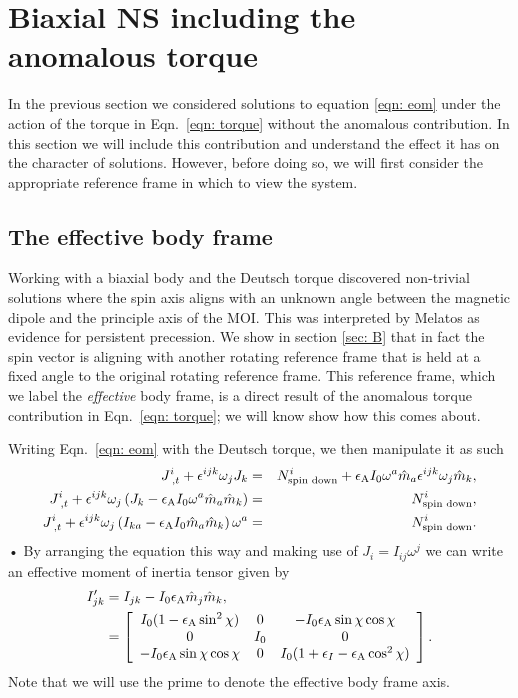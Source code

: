 \documentclass[../full_thesis/full_thesis.tex]{subfiles}
\begin{document}
\FloatBarrier

\section{Biaxial NS including the anomalous torque}
In the previous section we considered solutions to equation \eqref{eqn: eom}
under the action of the torque in Eqn.~\eqref{eqn: torque} without the
anomalous contribution. In this section we will include this contribution and
understand the effect it has on the character of solutions. However, before
doing so, we will first consider the appropriate reference frame in which to
view the system.

\subsection{The effective body frame}
\label{sec: effective body frame}
Working with a biaxial body and the Deutsch torque \cite{Melatos2000}
discovered non-trivial solutions where the spin axis aligns with an unknown
angle between the magnetic dipole and the principle axis of the MOI.  This was
interpreted by Melatos as evidence for persistent precession. We show in
section \ref{sec: B} that in fact the spin vector is aligning with another
rotating reference frame that is held at a fixed angle to the original rotating
reference frame. This reference frame, which we label the \emph{effective} body
frame, is a direct result of the anomalous torque contribution in
Eqn.~\eqref{eqn: torque}; we will know show how this comes about.

Writing Eqn.~\eqref{eqn: eom} with the Deutsch torque, we then manipulate it as
such
\begin{eqnarray*}
J^{i}_{\;,t}+\epsilon^{ijk}\omega_{j}J_{k} & =
& N^{i}_{\textrm{spin down}}+
\epsilon_{\mathrm{A}} I_{0}\omega^{a}\hat{m}_{a}\epsilon^{ijk}\omega_{j}\hat{m}_{k}, \\
J^{i}_{\;,t}+
\epsilon^{ijk}\omega_{j}\left(J_{k}-\epsilon_{\mathrm{A}} I_{0}\omega^{a}\hat{m}_{a}\hat{m}_{k}\right)
& = & N^{i}_{\textrm{spin down}}, \\
J^{i}_{\;,t}+
\epsilon^{ijk}\omega_{j}\left(I_{ka}-\epsilon_{\mathrm{A}} I_{0}\hat{m}_{a}\hat{m}_{k}\right)\omega^{a}
& = & N^{i}_{\textrm{spin down}}.
\end{eqnarray*}•
By arranging the equation this way and making use of $J_{i}=I_{ij}\omega^{j}$
we can write an effective moment of inertia tensor given by
\begin{align}
\begin{split}
I'_{jk}&=I_{jk}-I_{0}\epsilon_{\mathrm{A}}\hat{m}_{j}\hat{m}_{k}, \\
&= \left[
\begin{array}{ccc}
I_{0}(1-\epsilon_{\mathrm{A}}\sin^{2}\chi) & 0 & -I_{0}\epsilon_{\mathrm{A}}\sin\chi \cos \chi \\
0 & I_{0} & 0 \\  -I_{0}\epsilon_{\mathrm{A}}\sin\chi \cos \chi& 0 &
I_{0}(1+\epsilon_{I}-\epsilon_{\mathrm{A}}\cos^{2}\chi)
\end{array}
\right].
\end{split}
\label{eqn: effective MOI}
\end{align}
Note that we will use the prime to denote the effective body frame axis.
\end{document}
